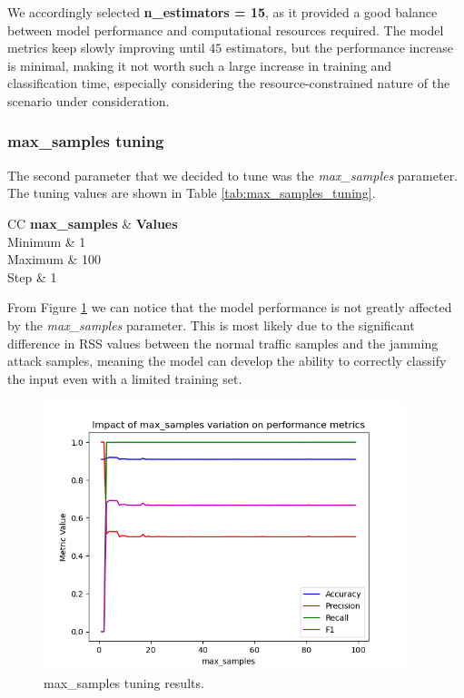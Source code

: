 \documentclass[futureinternet,article,submit,pdftex,moreauthors]{Definitions/mdpi}
\begin{document}
We accordingly selected \textbf{n\_estimators = 15}, as it provided a good balance between model performance and computational resources required.
The model metrics keep slowly improving until $45$ estimators, but the performance increase is minimal, making it not worth such a large increase in training and classification time, especially considering the resource-constrained nature of the scenario under consideration. 

\subsubsection{max\_samples tuning}

The second parameter that we decided to tune was the \textit{max\_samples} parameter. The tuning values are shown in Table \ref{tab:max_samples_tuning}.

\begin{table}[H]
	\caption{max\_samples tuning values.}\label{tab:max_samples_tuning}
	\begin{tabularx}{\textwidth}{CC}
	\toprule
	\textbf{max\_samples} & \textbf{Values} \\
	\midrule
	Minimum & 1 \\
	Maximum & 100 \\
	Step & 1 \\
	\bottomrule
\end{tabularx}
\end{table}

From Figure \ref{fig:max_samples_tuning} we can notice that the model performance is not greatly affected by the \textit{max\_samples} parameter. This is most likely due to the significant difference in RSS values between the normal traffic samples and the jamming attack samples, meaning the model can develop the ability to correctly classify the input even with a limited training set.

\begin{figure}[H]
	\centering
	\includegraphics[width=10.5cm]{img/maxSamplesTuning.png}
	\caption{max\_samples tuning results.}\label{fig:max_samples_tuning}
\end{figure}
\unskip
\end{document}
